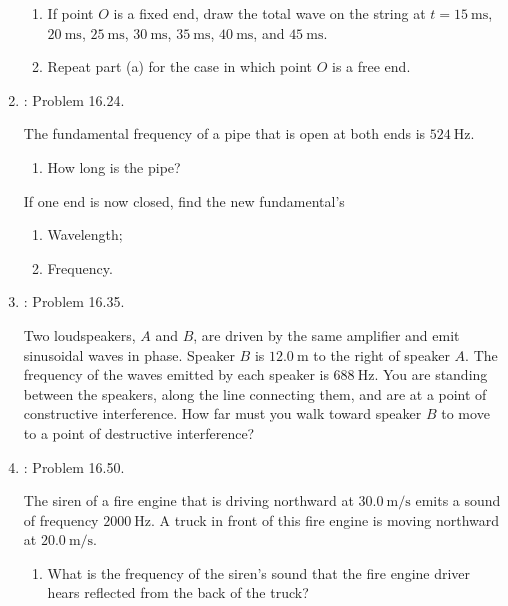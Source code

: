 \documentclass[../psets.tex]{subfiles}
\begin{document}
\begin{enumerate}[label={\arabic*)}]
\begin{center}
    \end{center}
    \begin{enumerate}
        \item If point $O$ is a fixed end, draw the total wave on the string at $t=\SI{15}{\milli\second}$, $\SI{20}{\milli\second}$, $\SI{25}{\milli\second}$, $\SI{30}{\milli\second}$, $\SI{35}{\milli\second}$, $\SI{40}{\milli\second}$, and $\SI{45}{\milli\second}$.
        \item Repeat part (a) for the case in which point $O$ is a free end.
    \end{enumerate}
    \item \textcite{bib:YoungFreedman}: Problem 16.24.\par
    The fundamental frequency of a pipe that is open at both ends is $\SI{524}{\hertz}$.
    \begin{enumerate}
        \item How long is the pipe?
    \end{enumerate}
    If one end is now closed, find the new fundamental's
    \begin{enumerate}[resume]
        \item Wavelength;
        \item Frequency.
    \end{enumerate}
    \item \textcite{bib:YoungFreedman}: Problem 16.35.\par
    Two loudspeakers, $A$ and $B$, are driven by the same amplifier and emit sinusoidal waves in phase. Speaker $B$ is $\SI{12.0}{\meter}$ to the right of speaker $A$. The frequency of the waves emitted by each speaker is $\SI{688}{\hertz}$. You are standing between the speakers, along the line connecting them, and are at a point of constructive interference. How far must you walk toward speaker $B$ to move to a point of destructive interference?
    \item \textcite{bib:YoungFreedman}: Problem 16.50.\par
    The siren of a fire engine that is driving northward at $\SI{30.0}{\meter\per\second}$ emits a sound of frequency $\SI{2000}{\hertz}$. A truck in front of this fire engine is moving northward at $\SI{20.0}{\meter\per\second}$.
    \begin{enumerate}
        \item What is the frequency of the siren's sound that the fire engine driver hears reflected from the back of the truck?

\end{enumerate}
\end{enumerate}
\end{document}
